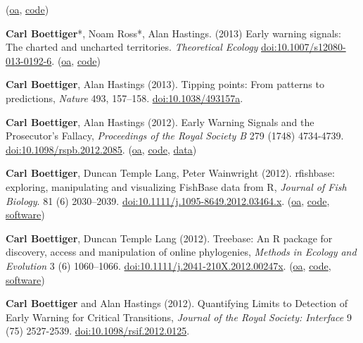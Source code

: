 \documentclass[10pt,sans]{moderncv}        %
\renewenvironment{enumerate}{\begin{etaremune}}{\end{etaremune}}
\begin{document}
\begin{enumerate}
  (\href{http://arxiv.org/abs/1307.4415}{oa},
  \href{https://github.com/cboettig/prosecutors-fallacy}{code})
\item
  \textbf{Carl Boettiger}*, Noam Ross*, Alan Hastings. (2013) Early
  warning signals: The charted and uncharted territories.
  \emph{Theoretical Ecology}
  \href{http://dx.doi.org/10.1007/s12080-013-0192-6}{doi:10.1007/s12080-013-0192-6}.
  (\href{http://arxiv.org/abs/1305.6700}{oa},
  \href{https://github.com/cboettig/ews-review}{code})
\item
  \textbf{Carl Boettiger}, Alan Hastings (2013). Tipping points: From
  patterns to predictions, \emph{Nature} 493, 157--158.
  \href{http://dx.doi.org/10.1038/493157a}{doi:10.1038/493157a}.
\item
  \textbf{Carl Boettiger}, Alan Hastings (2012). Early Warning Signals
  and the Prosecutor's Fallacy, \emph{Proceedings of the Royal Society
  B} 279 (1748) 4734-4739.
  \href{http://dx.doi.org/10.1098/rspb.2012.2085}{doi:10.1098/rspb.2012.2085}.
  (\href{http://arxiv.org/abs/1210.1204}{oa},
  \href{https://github.com/cboettig/prosecutors-fallacy}{code},
  \href{http://dx.doi.org/10.5061/dryad.2k462}{data})
\item
  \textbf{Carl Boettiger}, Duncan Temple Lang, Peter Wainwright (2012).
  rfishbase: exploring, manipulating and visualizing FishBase data from
  R, \emph{Journal of Fish Biology}. 81 (6) 2030--2039.
  \href{http://dx.doi.org/10.1111/j.1095-8649.2012.03464.x}{doi:10.1111/j.1095-8649.2012.03464.x}.
  (\href{https://github.com/ropensci/rfishbase/blob/master/inst/doc/rfishbase/rfishbase_github.md}{oa},
  \href{https://github.com/ropensci/rfishbase}{code},
  \href{http://cran.at.r-project.org/web/packages/rfishbase/}{software})
\item
  \textbf{Carl Boettiger}, Duncan Temple Lang (2012). Treebase: An R
  package for discovery, access and manipulation of online phylogenies,
  \emph{Methods in Ecology and Evolution} 3 (6) 1060--1066.
  \href{http://dx.doi.org/10.1111/j.2041-210X.2012.00247.x}{doi:10.1111/j.2041-210X.2012.00247x}.
  (\href{https://github.com/ropensci/treebase/blob/master/inst/doc/treebase/treebase_github.md}{oa},
  \href{https://github.com/ropensci/treebase}{code},
  \href{http://cran.at.r-project.org/web/packages/treebase/}{software})
\item
  \textbf{Carl Boettiger} and Alan Hastings (2012). Quantifying Limits
  to Detection of Early Warning for Critical Transitions, \emph{Journal
  of the Royal Society: Interface} 9 (75) 2527-2539.
  \href{http://dx.doi.org/10.1098/rsif.2012.0125}{doi:10.1098/rsif.2012.0125}.

\end{enumerate}
\end{document}
